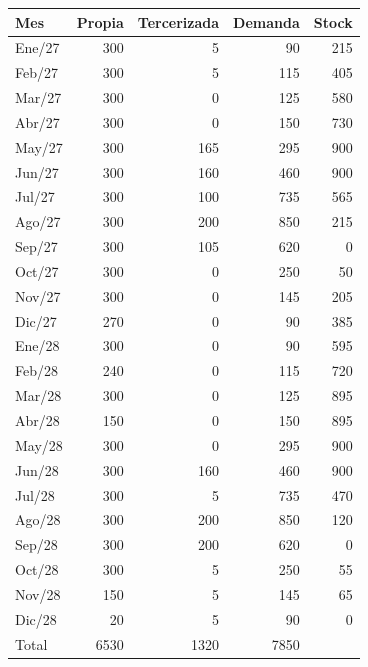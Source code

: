 \begin{tabular}{lr r r r}
\toprule
Mes & Propia & Tercerizada & Demanda & Stock \\
\midrule
Ene/27 & 300 & 5 & 90 & 215 \\
Feb/27 & 300 & 5 & 115 & 405 \\
Mar/27 & 300 & 0 & 125 & 580 \\
Abr/27 & 300 & 0 & 150 & 730 \\
May/27 & 300 & 165 & 295 & 900 \\
Jun/27 & 300 & 160 & 460 & 900 \\
Jul/27 & 300 & 100 & 735 & 565 \\
Ago/27 & 300 & 200 & 850 & 215 \\
Sep/27 & 300 & 105 & 620 & 0 \\
Oct/27 & 300 & 0 & 250 & 50 \\
Nov/27 & 300 & 0 & 145 & 205 \\
Dic/27 & 270 & 0 & 90 & 385 \\
Ene/28 & 300 & 0 & 90 & 595 \\
Feb/28 & 240 & 0 & 115 & 720 \\
Mar/28 & 300 & 0 & 125 & 895 \\
Abr/28 & 150 & 0 & 150 & 895 \\
May/28 & 300 & 0 & 295 & 900 \\
Jun/28 & 300 & 160 & 460 & 900 \\
Jul/28 & 300 & 5 & 735 & 470 \\
Ago/28 & 300 & 200 & 850 & 120 \\
Sep/28 & 300 & 200 & 620 & 0 \\
Oct/28 & 300 & 5 & 250 & 55 \\
Nov/28 & 150 & 5 & 145 & 65 \\
Dic/28 & 20 & 5 & 90 & 0 \\
\midrule
Total & 6530 & 1320 & 7850 &  \\
\bottomrule
\end{tabular}
